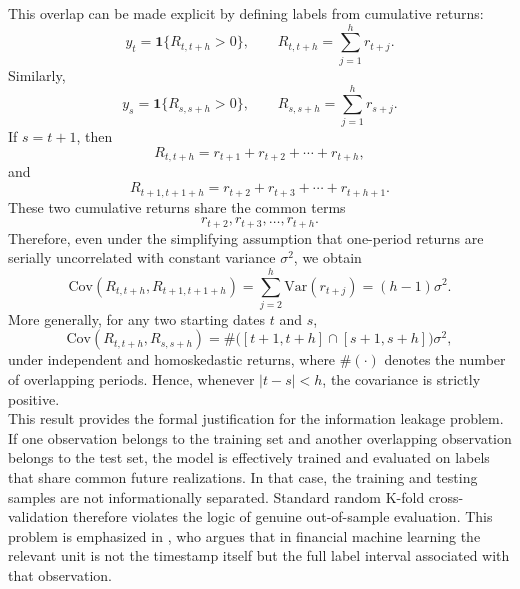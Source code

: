\documentclass{rQUF2e}
\begin{document}
\noindent This overlap can be made explicit by defining labels from cumulative returns:
\begin{equation}
y_t = \mathbf{1}\{R_{t,t+h}>0\},
\qquad
R_{t,t+h} = \sum_{j=1}^{h} r_{t+j}.
\end{equation}
Similarly,
\begin{equation}
y_s = \mathbf{1}\{R_{s,s+h}>0\},
\qquad
R_{s,s+h} = \sum_{j=1}^{h} r_{s+j}.
\end{equation}
If \(s=t+1\), then
\begin{equation}
R_{t,t+h} = r_{t+1}+r_{t+2}+\cdots+r_{t+h},
\end{equation}
and
\begin{equation}
R_{t+1,t+1+h} = r_{t+2}+r_{t+3}+\cdots+r_{t+h+1}.
\end{equation}
These two cumulative returns share the common terms
\begin{equation}
r_{t+2},r_{t+3},\dots,r_{t+h}.
\end{equation}
Therefore, even under the simplifying assumption that one-period returns are serially uncorrelated with constant variance \(\sigma^2\), we obtain
\begin{equation}
\mathrm{Cov}(R_{t,t+h},R_{t+1,t+1+h}) = \sum_{j=2}^{h}\mathrm{Var}(r_{t+j}) = (h-1)\sigma^2.
\end{equation}
More generally, for any two starting dates \(t\) and \(s\),
\begin{equation}
\mathrm{Cov}(R_{t,t+h},R_{s,s+h})
=
\#\big([t+1,t+h]\cap[s+1,s+h]\big)\sigma^2,
\end{equation}
under independent and homoskedastic returns, where \(\#(\cdot)\) denotes the number of overlapping periods. Hence, whenever \(|t-s|<h\), the covariance is strictly positive. \\

\noindent This result provides the formal justification for the information leakage problem. If one observation belongs to the training set and another overlapping observation belongs to the test set, the model is effectively trained and evaluated on labels that share common future realizations. In that case, the training and testing samples are not informationally separated. Standard random K-fold cross-validation therefore violates the logic of genuine out-of-sample evaluation. This problem is emphasized in \citet{lopez2018advances}, who argues that in financial machine learning the relevant unit is not the timestamp itself but the full label interval associated with that observation. \\
\end{document}
